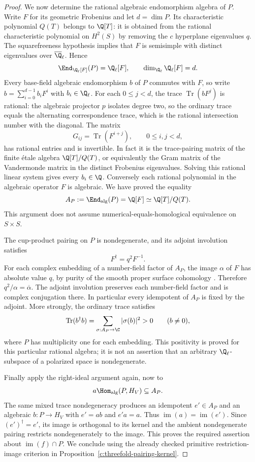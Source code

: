 \begin{proof}
We now determine the rational algebraic endomorphism algebra of $P$.
Write $F$ for its geometric Frobenius and let $d=\dim P$. Its
characteristic polynomial $Q(T)$ belongs to $\Q[T]$: it is obtained
from the rational characteristic polynomial on $H^2(S)$ by removing
the $c$ hyperplane eigenvalues $q$. The squarefreeness hypothesis
implies that $F$ is semisimple with distinct eigenvalues over
$\overline{\Q}_\ell$. Hence
\[
 \End_{\Q_\ell[F]}(P)=\Q_\ell[F],\qquad
 \dim_{\Q_\ell}\Q_\ell[F]=d.
\]
Every base-field algebraic endomorphism $b$ of $P$ commutes with $F$,
so write $b=\sum_{i=0}^{d-1}b_iF^i$ with $b_i\in\Q_\ell$.
For each $0\le j<d$, the trace $\operatorname{Tr}(bF^j)$ is rational:
the algebraic projector $p$ isolates degree two, so the ordinary trace
equals the alternating correspondence trace, which is the rational
intersection number with the diagonal. The matrix
\[
 G_{ij}=\operatorname{Tr}(F^{i+j}),\qquad 0\le i,j<d,
\]
has rational entries and is invertible. In fact it is the trace-pairing
matrix of the finite étale algebra $\Q[T]/Q(T)$, or equivalently the
Gram matrix of the Vandermonde matrix in the distinct Frobenius
eigenvalues. Solving this rational linear system gives every $b_i\in\Q$.
Conversely each rational polynomial in the algebraic operator $F$ is
algebraic. We have proved the equality
\[
 A_P:=\End_{\rm alg}(P)=\Q[F]\simeq\Q[T]/Q(T).
\]
This argument does not assume numerical-equals-homological equivalence
on $S\times S$.

The cup-product pairing on $P$ is nondegenerate, and its adjoint
involution satisfies
\[
 F^\dagger=q^2F^{-1}.
\]
For each complex embedding of a number-field factor of $A_P$, the
image $\alpha$ of $F$ has absolute value $q$, by purity of the smooth
proper surface cohomology
\citep[Corollary~3.3.9, p.~207]{c_deligneweil1980}.
Therefore $q^2/\alpha=\overline\alpha$.
The adjoint involution preserves each number-field factor and is
complex conjugation there. In particular every idempotent of $A_P$
is fixed by the adjoint. More strongly, the ordinary trace satisfies
\[
 \operatorname{Tr}(b^\dagger b)
   =\sum_{\sigma:A_P\to\C}|\sigma(b)|^2>0
 \qquad(b\ne0),
\]
where $P$ has multiplicity one for each embedding. This positivity
is proved for this particular rational algebra; it is not an assertion
that an arbitrary $\Q_\ell$-subspace of a polarized space is
nondegenerate.

Finally apply the right-ideal argument again, now to
\[
 a\Hom_{\rm alg}(P,H_V)\subseteq A_P.
\]
The same mixed trace nondegeneracy produces an idempotent $e'\in A_P$
and an algebraic $b:P\to H_V$ with $e'=ab$ and $e'a=a$.
Thus $\operatorname{im}(a)=\operatorname{im}(e')$. Since
$(e')^\dagger=e'$, its image is orthogonal to its kernel and the
ambient nondegenerate pairing restricts nondegenerately to the image.
This proves the required assertion about
$\operatorname{im}(f)\cap P$. We conclude using the already checked
primitive restriction-image criterion in
Proposition~\ref{c:threefold-pairing-kernel}.


\end{proof}
